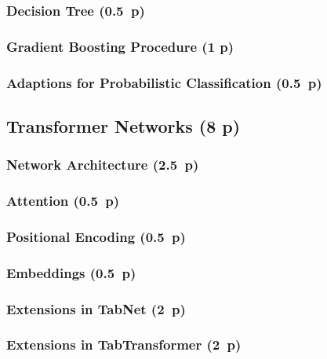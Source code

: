 \subsubsection{Decision Tree (0.5~p)}\label{decision-tree}

\subsubsection{Gradient Boosting
  Procedure (1 p)}\label{gradient-boosting-procedure}

\subsubsection{Adaptions for Probabilistic
  Classification (0.5~p)}\label{adaptions-for-probablistic-classification}

\subsection{Transformer Networks (8 p)}\label{transformer-networks}

\subsubsection{Network Architecture (2.5~p)}\label{network-architecture}

\subsubsection{Attention (0.5~p)}\label{attention}

\subsubsection{Positional Encoding (0.5~p)}\label{positional-encoding}

\subsubsection{Embeddings (0.5~p)}\label{embeddings}

\subsubsection{Extensions in TabNet (2~p)}\label{extensions-in-tabnet}

\subsubsection{Extensions in
  TabTransformer (2~p)}\label{extensions-in-tabtransformer}

